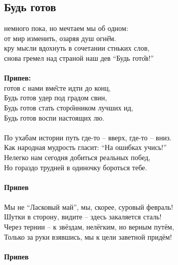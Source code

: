 \documentclass[fleqn,a5paper,12pt,twoside]{guitartabs}
\begin{document}
\subsection*{Будь готов}
     немного пока, но мечтаем мы  об одном:\\
    от мир изменить, озаряя душ огн\G{ём}.\\
    кру мысли вдохнуть в сочетании стньких слов,\\
     снова гремел над страной наш дев ``Будь гот\G{ов}!''\\
    \\    
    \-\hspace{10mm}\textbf{Припев:}\\
    \-\hspace{10mm} готов с нами вм\G{есте} идти до конц, \\
    \-\hspace{10mm}Будь готов удер под градом свин,\\
    \-\hspace{10mm}Будь готов стать стор\G{онник}ом лучших ид,\\
    \-\hspace{10mm}Будь готов воспи настоящих лю.\\
    \\
    По ухабам истории путь где-то -- вверх, где-то -- вниз.\\
    Как народная мудрость гласит: ``На ошибках учись!''\\
    Нелегко нам сегодня добиться реальных побед,\\
    Но гораздо трудней в одиночку бороться тебе.\\
    \\
    \-\hspace{10mm}\textbf{Припев}\\
    \\
    Мы не ``Ласковый май'', мы, скорее, суровый февраль! \\
    Шутки в сторону, видите -- здесь закаляется сталь!   \\
    Через тернии -- к звёздам, нелёгким, но верным путём, \\        
    Только за руки взявшись, мы к цели заветной придём!\\
    \\
    \-\hspace{10mm}\textbf{Припев}\\
\newpage
{}    %
\end{document}
